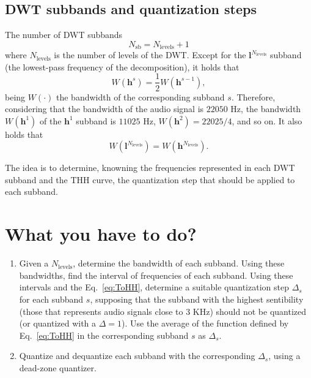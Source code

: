 \subsection{DWT subbands and quantization steps}
The number of DWT subbands
\begin{equation}
  N_{\text{sb}} = N_{\text{levels}} + 1
\end{equation}
where $N_{\text{levels}}$ is the number of levels of the DWT. Except
for the ${\mathbf l}^{N_{\text{levels}}}$ subband (the lowest-pass
frequency of the decomposition), it holds that
\begin{equation}
  W({\mathbf h}^s) = \frac{1}{2}W({\mathbf h}^{s-1}),
\end{equation}
being $W(\cdot)$ the bandwidth of the corresponding
subband $s$. Therefore, considering that the bandwidth of the audio signal
is $22050$ Hz, the bandwidth $W({\mathbf h}^1)$ of the ${\mathbf h}^1$ subband is $11025$ Hz,
$W({\mathbf h} ^2)=22025/4$, and so on. It also holds that
\begin{equation}
  W({\mathbf l}^{N_{\text{levels}}}) = W({\mathbf h}^{N_{\text{levels}}}).
\end{equation}

The idea is to determine, knowning the frequencies represented in each
DWT subband and the THH curve, the quantization step that should be
applied to each subband.

\section{What you have to do?}

  
\begin{enumerate}
\item Given a $N_{\text{levels}}$, determine the bandwidth of each
  subband. Using these bandwidths, find the interval of frequencies of
  each subband. Using these intervals and the Eq.~\ref{eq:ToHH},
  determine a suitable quantization step $\Delta_s$ for each subband
  $s$, supposing that the subband with the highest sentibility (those
  that represents audio signals close to $3$ KHz) should not be
  quantized (or quantized with a $\Delta=1$). Use the average of the
  function defined by Eq.~\ref{eq:ToHH} in the corresponding subband
  $s$ as $\Delta_s$.
\item Quantize and dequantize each subband with the corresponding
  $\Delta_s$, using a dead-zone quantizer.
\end{enumerate}


